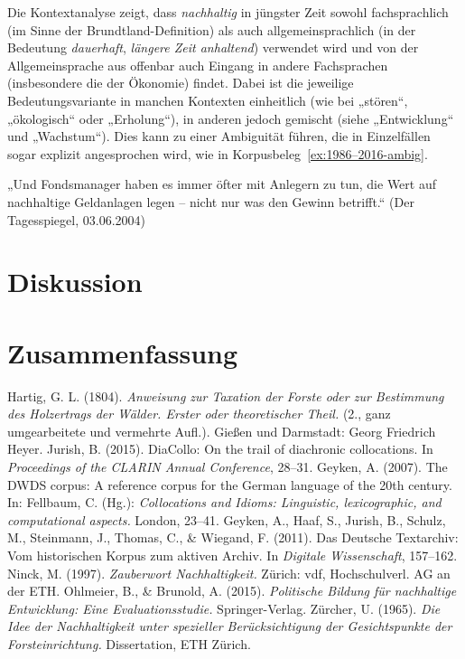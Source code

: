 \documentclass[
    german,
    a4paper,%
    12pt,%
    oneside,%
    toc=bibliography,
    final,
]{scrartcl}
\begin{document}
Die Kontextanalyse zeigt, dass \textit{nachhaltig} in jüngster Zeit sowohl fachsprachlich (im Sinne der Brundtland-Definition) als auch allgemeinsprachlich (in der Bedeutung \textit{dauerhaft}, \textit{längere Zeit anhaltend}) verwendet wird und von der Allgemeinsprache aus offenbar auch Eingang in andere Fachsprachen (insbesondere die der Ökonomie) findet. Dabei ist die jeweilige Bedeutungsvariante in manchen Kontexten einheitlich (wie bei „stören“, „ökologisch“ oder „Erholung“), in anderen jedoch gemischt (siehe „Entwicklung“ und „Wachstum“). Dies kann zu einer Ambiguität führen, die in Einzelfällen sogar explizit angesprochen wird, wie in Korpusbeleg~\ref{ex:1986–2016-ambig}.

\begin{exe}
\ex\label{ex:1986–2016-ambig} „Und Fondsmanager haben es immer öfter mit Anlegern zu tun, die Wert auf nachhaltige Geldanlagen legen – nicht nur was den Gewinn betrifft.“ (Der Tagesspiegel, 03.06.2004)
\end{exe}

\section{Diskussion}
\label{sec:diskussion}


\section{Zusammenfassung}
\label{sec:zusammenfassung}



\newpage
\begin{thebibliography}{9}

 Hartig, G. L. (1804). \textit{Anweisung zur Taxation der Forste oder zur Bestimmung des Holzertrags der Wälder. Erster oder theoretischer Theil.} (2., ganz umgearbeitete und vermehrte Aufl.). Gießen und Darmstadt: Georg Friedrich Heyer.
 Jurish, B. (2015). DiaCollo: On the trail of diachronic collocations. In \textit{Proceedings of the CLARIN Annual Conference}, 28–31.
 Geyken, A. (2007). The DWDS corpus: A reference corpus for the German language of the 20th century. In: Fellbaum, C. (Hg.): \textit{Collocations and Idioms: Linguistic, lexicographic, and computational aspects.} London, 23–41.
 Geyken, A., Haaf, S., Jurish, B., Schulz, M., Steinmann, J., Thomas, C., \& Wiegand, F. (2011). Das Deutsche Textarchiv: Vom historischen Korpus zum aktiven Archiv. In \textit{Digitale Wissenschaft}, 157–162.
 Ninck, M. (1997). \textit{Zauberwort Nachhaltigkeit.} Zürich: vdf, Hochschulverl. AG an der ETH.
 Ohlmeier, B., \& Brunold, A. (2015). \textit{Politische Bildung für nachhaltige Entwicklung: Eine Evaluationsstudie.} Springer-Verlag.
 Zürcher, U. (1965). \textit{Die Idee der Nachhaltigkeit unter spezieller Berücksichtigung der Gesichtspunkte der Forsteinrichtung.} Dissertation, ETH Zürich.

\end{thebibliography}
\end{document}
